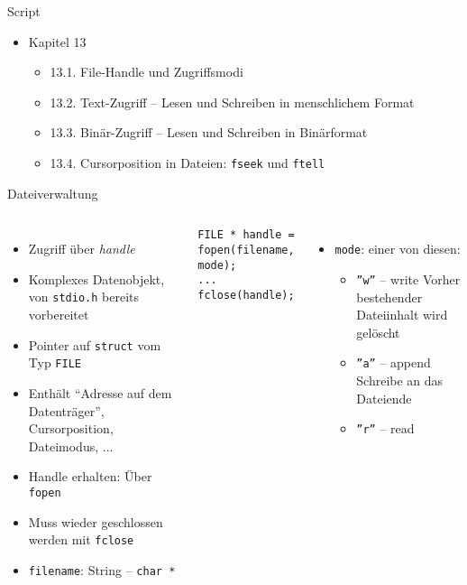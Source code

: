 
\begin{frame}{Script}
%
\begin{itemize}
\item Kapitel 13
	\begin{itemize}
	\item 13.1. File-Handle und Zugriffsmodi
	\item 13.2. Text-Zugriff – Lesen und Schreiben in menschlichem Format
	\item 13.3. Binär-Zugriff – Lesen und Schreiben in Binärformat
	\item 13.4. Cursorposition in Dateien: \texttt{fseek} und \texttt{ftell}
	\end{itemize}
\end{itemize}
%
\end{frame}


\begin{frame}[fragile]{Dateiverwaltung}
%
\begin{columns}[T]
\begin{itemize}
\item Zugriff über \emph{handle}
	\item Komplexes Datenobjekt, von \texttt{stdio.h} bereits vorbereitet
	\item Pointer auf \texttt{struct} vom Typ \texttt{FILE}
	\item Enthält \enquote{Adresse auf dem Datenträger}, Cursorposition, Dateimodus, ...
\item Handle erhalten: Über \texttt{fopen}
\item Muss wieder geschlossen werden mit \texttt{fclose}
\item \texttt{filename}: String -- \texttt{char *}
\end{itemize}
%
\vspace{-10pt}
\begin{codebox}
\begin{verbatim}
FILE * handle = fopen(filename, mode);
...
fclose(handle);
\end{verbatim}
\end{codebox}
%
\begin{itemize}
\item \texttt{mode}: einer von diesen:
	\begin{itemize}
	\item \texttt{''w''} -- write\newline
		Vorher bestehender Dateiinhalt wird gelöscht
	\item \texttt{''a''} -- append\newline
		Schreibe an das Dateiende
	\item \texttt{''r''} -- read
	\end{itemize}
\end{itemize}
%
\end{columns}
%
\end{frame}

